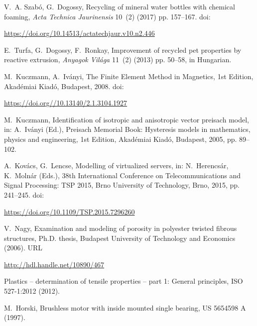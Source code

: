 \documentclass[10pt,a4paper,twocolumns]{article}
\begin{document}
\begin{thebibliography}{1}

V.~A. Szabó, G.~Dogossy, Recycling of mineral water bottles with chemical
  foaming,  \textit{Acta Technica Jaurinensis} 10~(2) (2017) pp. 157--167.
	\newline doi: \begin{footnotesize}\url{https://doi.org/10.14513/actatechjaur.v10.n2.446}\end{footnotesize}

E.~Turfa, G.~Dogossy, F.~Ronkay, Improvement of recycled pet properties by
  reactive extrusion,  \textit{Anyagok Világa} 11~(2) (2013) pp. 50--58, in Hungarian.

M.~Kuczmann, A.~Iványi, The Finite Element Method in Magnetics, 1st Edition,
  Akadémiai Kiadó, Budapest, 2008.
	\newline doi: \begin{footnotesize}\url{https://doi.org//10.13140/2.1.3104.1927}\end{footnotesize}

M.~Kuczmann, Identification of isotropic and anisotropic vector preisach model,
  in: A.~Iványi (Ed.), Preisach Memorial Book: Hysteresis models in
  mathematics, physics and engineering, 1st Edition, Akadémiai Kiadó,
  Budapest, 2005, pp. 89--102.

A.~Kovács, G.~Lencse, Modelling of virtualized servers, in: N.~Herencsár,
  K.~Molnár (Eds.), 38th International Conference on Telecommunications and
  Signal Processing: TSP 2015, Brno University of Technology, Brno, 2015, pp.
  241--245.
	\newline doi: \begin{footnotesize}\url{https://doi.org/10.1109/TSP.2015.7296260}\end{footnotesize}


V.~Nagy, Examination and modeling of porosity in polyester twisted fibrous
  structures, Ph.D. thesis, Budapest University of Technology and Economics
  (2006).
	\newline URL \begin{footnotesize}\url{http://hdl.handle.net/10890/467}\end{footnotesize}

Plastics -- determination of tensile properties -- part 1: General principles,
  {ISO 527-1:2012} (2012).

M.~Horski, Brushless motor with inside mounted single bearing, {US 5654598 A}
  (1997).


\end{thebibliography}
\end{document}
